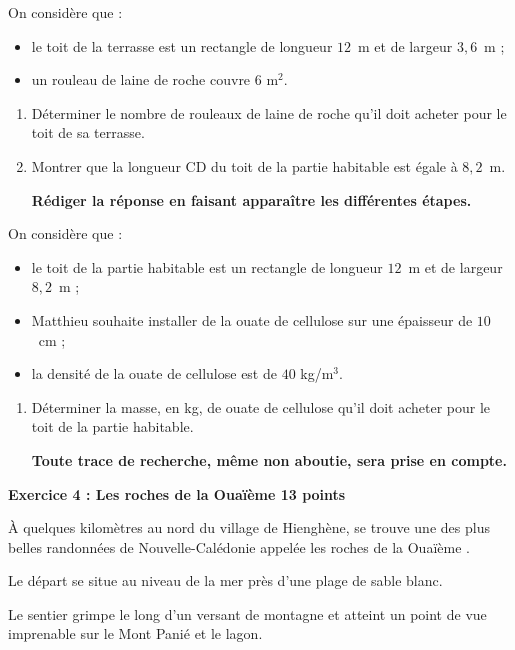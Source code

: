 \documentclass[11pt]{article}
\begin{document}
On considère que :

\begin{itemize}
\item le toit de la terrasse est un rectangle de longueur $12$~m et de largeur $3,6$~m ; 
\item un rouleau de laine de roche couvre 6 m$^2$.
\end{itemize}

\begin{enumerate}[resume]
\item  Déterminer le nombre de rouleaux de laine de roche qu'il doit acheter pour le toit de sa terrasse.
\item Montrer que la longueur CD du toit de la partie habitable est égale à $8,2$~m.

\textbf{Rédiger la réponse en faisant apparaître les différentes étapes.}
\end{enumerate}

On considère que :

\begin{itemize}
\item le toit de la partie habitable est un rectangle de longueur $12$~m et de largeur $8,2$~m ;
\item Matthieu souhaite installer de la ouate de cellulose sur une épaisseur de $10$~cm ; 
\item la densité de la ouate de cellulose est de $40$ kg/m$^3$.
\end{itemize}
\begin{enumerate}[resume]
\item Déterminer la masse, en kg, de ouate de cellulose qu'il doit acheter pour le toit de la partie habitable.

\textbf{Toute trace de recherche, même non aboutie, sera prise en compte.}
\end{enumerate}

\bigskip

\textbf{Exercice 4 : Les roches de la Ouaïème \hfill 13 points}

\medskip

À quelques kilomètres au nord du village de Hienghène, se trouve une des plus belles
randonnées de Nouvelle-Calédonie appelée \og les roches de la Ouaïème \fg.

Le départ se situe au niveau de la mer près d'une plage de sable blanc.

Le sentier grimpe le long d'un versant de montagne et atteint un point de vue imprenable sur le Mont Panié et le lagon.
\end{document}
